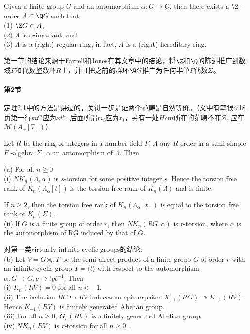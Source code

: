 \begin{theorem}
Given a  finite  group  $G$  and  an automorphism  $\alpha: G \rightarrow  G$, then there  exists  a  $\Z$-order  $A \subset \Q G$  such that \\
(1) $\Z G\subset A$, \\
(2) $A$  is  $\alpha$-invariant,  and \\
(3) $A$  is  a  (right) {\color{red}regular}  ring,  in fact,  $A$  is  a  (right) hereditary  ring. 
\end{theorem}
第一节的结论来源于Farrell和Jones在其文章中的结论，将$\Z$和$\Q$的陈述推广到数域$F$和代数整数环$R$上，并且把之前的群环$\Q G$推广为任何半单$F$代数$\Sigma$。
\paragraph{第2节}
定理2.1中的方法是讲过的，关键一步是证两个范畴是自然等价。（文中有笔误:718页第一行$mt^n$应为$xt^n$, 后面所谓$m_i$应为$x_i$，另有一处$Hom$所在的范畴不在$\mathcal{B}$, 应在$\mathcal{M}(A_\alpha[T])$）
\begin{theorem}[2.2]
Let $R$ be the ring of integers in a number field $F$, $\Lambda$ any $R$-order
in a semi-simple $F$ -algebra $\Sigma$, $\alpha$ an automorphism of $\Lambda$. Then

(a) For all $n \geq 0$\\
(i) $NK_n(\Lambda,\alpha)$ is $s$-torsion for some positive integer $s$. Hence the torsion free
rank of $K_n(\Lambda_\alpha[t])$ is the torsion free rank of $K_n(\Lambda)$ and is finite.

 If $n \geq 2$, then the torsion free rank of $K_n(\Lambda_\alpha[t])$ is equal to the torsion free rank of $K_n(\Sigma)$.\\
(ii) If $G$ is a finite group of order $r$, then $NK_n(RG, \alpha)$ is $r$-torsion, where $\alpha$ is the automorphism of RG induced by that of $G$.

对第一类virtually infinite cyclic groups的结论: \\
(b) Let $V = G \rtimes_\alpha T$ be the semi-direct product of a finite group $G$ of order $r$ with an infinite cyclic group $T =\langle t\rangle$ with respect to the automorphism $\alpha : G\longrightarrow G , g \mapsto tgt^{-1}$. Then\\
(i) $K_n(RV) = 0$ for all $ n< -1$.\\
(ii) The inclusion $RG \hookrightarrow RV$ induces an epimorphism $K_{-1}(RG) \twoheadrightarrow K_{-1}
(RV)$. Hence $K_{-1}(RV)$ is finitely generated Abelian group.\\
(iii) For all $ n \geq 0$, $G_n(RV)$ is a finitely generated Abelian group.\\
(iv) $NK_n(RV ) $ is $r$-torsion for all $n \geq 0$ .
\end{theorem}

